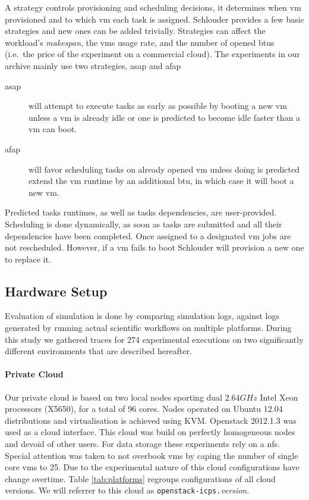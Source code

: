 A strategy controls provisioning and scheduling decisions, it determines when
\ac{vm} provisioned and to which \ac{vm} each task is assigned. Schlouder
provides a few basic strategies and new ones can be added trivially. Strategies
can affect the workload's \emph{makespan}, the \acp{vm} usage rate, and the
number of opened \acp{btu} (i.e.\ the price of the experiment on a commercial
cloud). The experiments in our archive mainly use two strategies, \ac{asap} and
\ac{afap}

\begin{description}
	\item[\ac{asap}] will attempt to execute tasks as early as possible by
		booting a new \ac{vm} unless a \ac{vm} is already idle or one is
		predicted to become idle faster than a \ac{vm} can boot.
	\item[\ac{afap}] will favor scheduling tasks on already opened \ac{vm}
		unless doing is predicted extend the \ac{vm} runtime by an
		additional \ac{btu}, in which case it will boot a new \ac{vm}.
\end{description}

Predicted  tasks runtimes,  as well  as tasks  dependencies, are  user-provided.
Scheduling is  done dynamically, as  soon as tasks  are submitted and  all their
dependencies have been completed. Once assigned to a designated \ac{vm} jobs are
not rescheduled. However, if a \ac{vm}  fails to boot Schlouder will provision a
new one to replace it.

\subsection{Hardware Setup}

Evaluation  of simulation  is done  by comparing  simulation logs,  against logs
generated by running  actual scientific workflows on  multiple platforms. During
this  study  we   gathered  traces  for  274  experimental   executions  on  two
significantly different environments that are described hereafter.


\paragraph{Private Cloud}

Our private cloud is based on two local nodes sporting dual $2.64GHz$ Intel Xeon
processors (X5650),  for a  total of  96 cores. Nodes  operated on  Ubuntu 12.04
distributions and virtualisation  is achieved using KVM.  Openstack 2012.1.3 was
used as a  cloud interface. This cloud was build  on perfectly homogeneous nodes
and  devoid  of other  users.  For  data storage  these  experiments  rely on  a
\ac{nfs}. Special  attention was taken  to not  overbook \acp{vm} by  caping the
number of  single core \acp{vm}  to 25. Due to  the experimental nature  of this
cloud configurations  have change  overtime. Table  \ref{tab:platforms} regroups
configurations  of  all cloud  versions.  We  will  referrer  to this  cloud  as
\texttt{openstack-icps.}\emph{version}.


